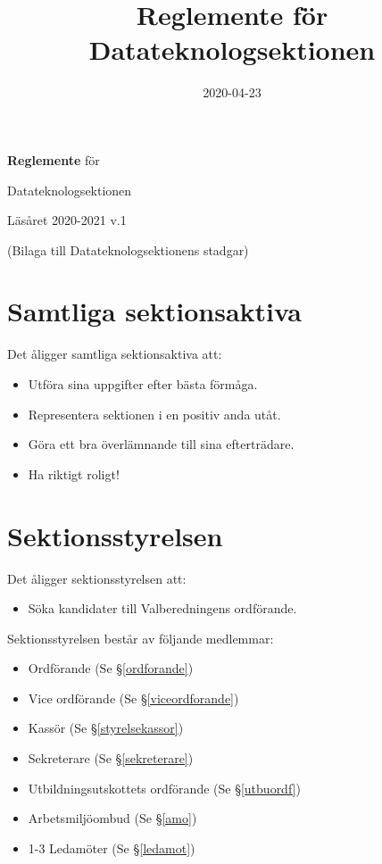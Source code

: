 \documentclass{datateknologsektionen-document}
\title{Reglemente för Datateknologsektionen}
\date{2020-04-23}
\begin{document}
\hspace{0pt}
\vfill
\begin{center}

\Huge{
  \textbf{Reglemente} för
  
  Datateknologsektionen
  
  Läsåret 2020-2021 v.1
}

  \vspace{30pt}

\Large{(Bilaga till Datateknologsektionens stadgar)}
  
\end{center}
\vfill
\hspace{0pt}

\pagebreak

\tableofcontents

\pagebreak

\section{Samtliga sektionsaktiva}
Det åligger samtliga sektionsaktiva att:
\begin{itemize}
  \item Utföra sina uppgifter efter bästa förmåga.
  \item Representera sektionen i en positiv anda utåt.
  \item Göra ett bra överlämnande till sina efterträdare.
  \item Ha riktigt roligt!
\end{itemize}

\section{Sektionsstyrelsen}
Det åligger sektionsstyrelsen att:
\begin{itemize}
  \item Söka kandidater till Valberedningens ordförande.
\end{itemize}
Sektionsstyrelsen består av följande medlemmar:
\begin{itemize}
  \item Ordförande (Se \S \ref{ordforande})
  \item Vice ordförande (Se \S \ref{viceordforande})
  \item Kassör (Se \S \ref{styrelsekassor})
  \item Sekreterare (Se \S \ref{sekreterare})
  \item Utbildningsutskottets ordförande (Se \S \ref{utbuordf})
  \item Arbetsmiljöombud (Se \S \ref{amo})
  \item 1-3 Ledamöter (Se \S \ref{ledamot})
\end{itemize}
\end{document}
